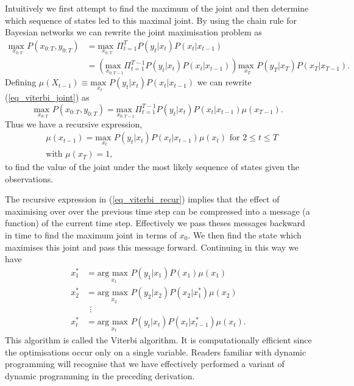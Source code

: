 Intuitively we first attempt to find the maximum of the joint and then determine which sequence of states led to this maximal joint. By using the chain rule for Bayesian networks we can rewrite the joint maximisation problem as
\begin{equation}
\begin{aligned}
\underset{x_{0:T}}{\text{max }} P(x_{0:T}, y_{0:T}) &= \underset{x_{0:T}}{\text{max }} \Pi_{t=1}^T P(y_t|x_t) P(x_t|x_{t-1})\\
&= \left(\underset{x_{0:T-1}}{\text{max }} \Pi_{t=1}^{T-1} P(y_t|x_t) P(x_t|x_{t-1}) \right) \underset{x_{T}}{\text{max }} P(y_T|x_T) P(x_T|x_{T-1}).
\end{aligned}
\label{eq_viterbi_joint}
\end{equation}
Defining $\mu(X_{t-1}) \equiv \underset{x_{t}}{\text{max }} P(y_t|x_t) P(x_t|x_{t-1})$ we can rewrite (\ref{eq_viterbi_joint}) as \begin{equation}
\underset{x_{0:T}}{\text{max }} P(x_{0:T}, y_{0:T}) =\underset{x_{0:T-1}}{\text{max }} \Pi_{t=1}^{T-1} P(y_t|x_t) P(x_t|x_{t-1}) \mu(x_{T-1}).
\label{eq_viterbi_max_factor_mu}
\end{equation}
Thus we have a recursive expression,
\begin{equation}
\begin{aligned}
&\mu(x_{t-1}) = \underset{x_{t}}{\text{max }} P(y_t|x_t) P(x_t|x_{t-1}) \mu(x_t) \text{ for } 2 \leq t \leq T \\
&\text{with } \mu(x_T) = 1, 
\end{aligned}
\label{eq_viterbi_recur}
\end{equation}
to find the value of the joint under the most likely sequence of states given the observations.

The recursive expression in (\ref{eq_viterbi_recur}) implies that the effect of maximising over over the previous time step can be compressed into a message (a function) of the current time step. Effectively we pass theses messages backward in time to find the maximum joint in terms of $x_0$. We then find the state which maximises this joint and pass this message forward.  Continuing in this way we have
\begin{equation}
\begin{aligned}
x_1^* &= \underset{x_{1}}{\text{arg max }}P(y_1|x_1)P(x_1)\mu(x_1) \\
x_2^* &= \underset{x_{2}}{\text{arg max }}P(y_2|x_2)P(x_2|x_1^*)\mu(x_2) \\
&~~\vdots \\
x_t^* &= \underset{x_{t}}{\text{arg max }}P(y_t|x_t)P(x_t|x_{t-1}^*)\mu(x_t).
\end{aligned}
\label{eq_viterbi_recur_forward}
\end{equation}
This algorithm is called the Viterbi algorithm. It is computationally efficient since the optimisations occur only on a single variable. Readers familiar with dynamic programming will recognise that we have effectively performed a variant of dynamic programming in the preceding derivation.

